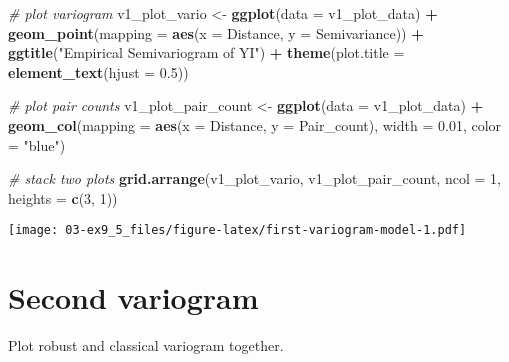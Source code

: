 \documentclass[]{book}
\newenvironment{Shaded}{\begin{snugshade}}{\end{snugshade}}
\newcommand{\CommentTok}[1]{\textcolor[rgb]{0.56,0.35,0.01}{\textit{#1}}}
\newcommand{\DataTypeTok}[1]{\textcolor[rgb]{0.13,0.29,0.53}{#1}}
\newcommand{\DecValTok}[1]{\textcolor[rgb]{0.00,0.00,0.81}{#1}}
\newcommand{\FloatTok}[1]{\textcolor[rgb]{0.00,0.00,0.81}{#1}}
\newcommand{\KeywordTok}[1]{\textcolor[rgb]{0.13,0.29,0.53}{\textbf{#1}}}
\newcommand{\NormalTok}[1]{#1}
\newcommand{\OperatorTok}[1]{\textcolor[rgb]{0.81,0.36,0.00}{\textbf{#1}}}
\newcommand{\StringTok}[1]{\textcolor[rgb]{0.31,0.60,0.02}{#1}}
\begin{document}
\begin{Shaded}
\begin{Highlighting}[]
\CommentTok{# plot variogram}
\NormalTok{v1_plot_vario <-}\StringTok{ }\KeywordTok{ggplot}\NormalTok{(}\DataTypeTok{data =}\NormalTok{ v1_plot_data) }\OperatorTok{+}
\StringTok{  }\KeywordTok{geom_point}\NormalTok{(}\DataTypeTok{mapping =} \KeywordTok{aes}\NormalTok{(}\DataTypeTok{x =}\NormalTok{ Distance, }\DataTypeTok{y =}\NormalTok{ Semivariance)) }\OperatorTok{+}
\StringTok{  }\KeywordTok{ggtitle}\NormalTok{(}\StringTok{"Empirical Semivariogram of YI"}\NormalTok{) }\OperatorTok{+}
\StringTok{  }\KeywordTok{theme}\NormalTok{(}\DataTypeTok{plot.title =} \KeywordTok{element_text}\NormalTok{(}\DataTypeTok{hjust =} \FloatTok{0.5}\NormalTok{))}

\CommentTok{# plot pair counts}
\NormalTok{v1_plot_pair_count <-}\StringTok{ }\KeywordTok{ggplot}\NormalTok{(}\DataTypeTok{data =}\NormalTok{ v1_plot_data) }\OperatorTok{+}
\StringTok{  }\KeywordTok{geom_col}\NormalTok{(}\DataTypeTok{mapping =} \KeywordTok{aes}\NormalTok{(}\DataTypeTok{x =}\NormalTok{ Distance, }\DataTypeTok{y =}\NormalTok{ Pair_count), }\DataTypeTok{width =} \FloatTok{0.01}\NormalTok{, }\DataTypeTok{color =} \StringTok{"blue"}\NormalTok{)}

\CommentTok{# stack two plots}
\KeywordTok{grid.arrange}\NormalTok{(v1_plot_vario, v1_plot_pair_count,}
             \DataTypeTok{ncol =} \DecValTok{1}\NormalTok{, }\DataTypeTok{heights =} \KeywordTok{c}\NormalTok{(}\DecValTok{3}\NormalTok{, }\DecValTok{1}\NormalTok{))}
\end{Highlighting}
\end{Shaded}

\texttt{[image: 03-ex9\_5\_files/figure-latex/first-variogram-model-1.pdf]}

\hypertarget{second-variogram-1}{%
\section{Second variogram}\label{second-variogram-1}}

Plot robust and classical variogram together.

\begin{Shaded}
\end{Shaded}
\end{document}
